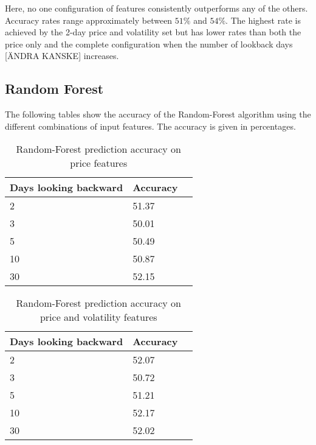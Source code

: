 \documentclass{article}
\begin{document}
Here, no one configuration of features consistently outperforms any of the others. Accuracy rates range approximately between $51\%$ and $54\%$. The highest rate is achieved by the 2-day price and volatility set but has lower rates than both the price only and the complete configuration when the number of lookback days [ÄNDRA KANSKE] increases.

\newpage
\subsection{Random Forest}
The following tables show the accuracy of the Random-Forest algorithm using the different combinations of input features. The accuracy is given in percentages.
\\
\begin{table}[!h]
\begin{center}
    \begin{tabular}{ | l | l | p{3cm} |}
    \hline
    Days looking backward & Accuracy \\ \hline
    2 & 51.37  \\ \hline
    3 & 50.01  \\ \hline
    5 & 50.49  \\ \hline
    10 & 50.87  \\ \hline
    30 & 52.15 \\ 
    \hline
    \end{tabular}
\caption{Random-Forest prediction accuracy on price features}
\end{center}
\end{table}

\begin{table}[h]
\begin{center}
    \begin{tabular}{ | l | l | p{3cm} |}
    \hline
    Days looking backward & Accuracy \\ \hline
    2 & 52.07  \\ \hline
    3 & 50.72  \\ \hline
    5 & 51.21  \\ \hline
    10 & 52.17  \\ \hline
    30 & 52.02 \\ 
    \hline
    \end{tabular}
\caption{Random-Forest prediction accuracy on price and volatility features}
\end{center}
\end{table}
\end{document}
